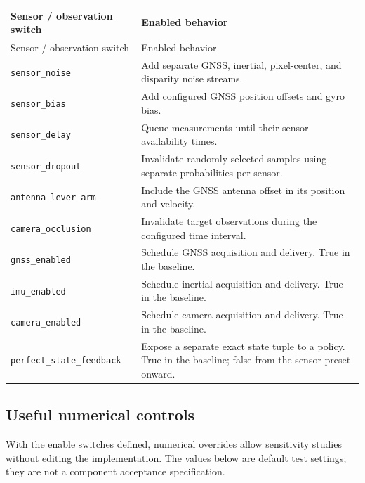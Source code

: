 \documentclass[10pt,letterpaper]{article}
\begin{document}
{\footnotesize
\setlength{\tabcolsep}{5pt}
\renewcommand{\arraystretch}{1.18}
\begin{longtable}{@{}>{\raggedright\arraybackslash}p{}>{\raggedright\arraybackslash}p{}@{}}
\toprule
Sensor / observation switch & Enabled behavior \\
\midrule
\endfirsthead
\toprule
Sensor / observation switch & Enabled behavior \\
\midrule
\endhead
\bottomrule
\endfoot
\texttt{sensor\_noise} & Add separate GNSS, inertial, pixel-center, and disparity noise streams. \\
\addlinespace[3pt]
\texttt{sensor\_bias} & Add configured GNSS position offsets and gyro bias. \\
\addlinespace[3pt]
\texttt{sensor\_delay} & Queue measurements until their sensor availability times. \\
\addlinespace[3pt]
\texttt{sensor\_dropout} & Invalidate randomly selected samples using separate probabilities per sensor. \\
\addlinespace[3pt]
\texttt{antenna\_lever\_arm} & Include the GNSS antenna offset in its position and velocity. \\
\addlinespace[3pt]
\texttt{camera\_occlusion} & Invalidate target observations during the configured time interval. \\
\addlinespace[3pt]
\texttt{gnss\_enabled} & Schedule GNSS acquisition and delivery. True in the baseline. \\
\addlinespace[3pt]
\texttt{imu\_enabled} & Schedule inertial acquisition and delivery. True in the baseline. \\
\addlinespace[3pt]
\texttt{camera\_enabled} & Schedule camera acquisition and delivery. True in the baseline. \\
\addlinespace[3pt]
\texttt{perfect\_state\_feedback} & Expose a separate exact state tuple to a policy. True in the baseline; false from the sensor preset onward. \\
\end{longtable}
}


\subsection{Useful numerical controls}

With the enable switches defined, numerical overrides allow sensitivity studies without editing the implementation. The values below are default test settings; they are not a component acceptance specification.
\end{document}
